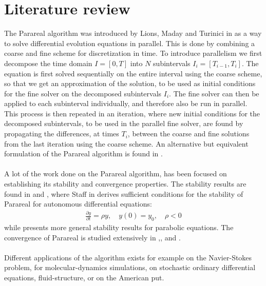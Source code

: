 \chapter{Literature review}
The Parareal algorithm was introduced by Lions, Maday and Turinici in \cite{lions2001resolution} as a way to solve differential evolution equations in parallel. This is done by combining a coarse and fine scheme for discretization in time. To introduce parallelism we first decompose the time domain $I=[0,T]$ into $N$ subintervals $I_i=[T_{i-1},T_i]$. The equation is first solved sequentially on the entire interval using the coarse scheme, so that we get an approximation of the solution, to be used as initial conditions for the fine solver on the decomposed subintervals $I_i$. The fine solver can then be applied to each subinterval individually, and therefore also be run in parallel. This process is then repeated in an iteration, where new initial conditions for the decomposed subintervals, to be used in the parallel fine solver, are found by propagating the differences, at times $T_i$, between the coarse and fine solutions from the last iteration using the coarse scheme. An alternative but equivalent formulation of the Parareal algorithm is found in \cite{baffico2002parallel}. 
\\
\\
A lot of the work done on the Parareal algorithm, has been focused on establishing its stability and convergence properties. The stability results are found in \cite{staff2005stability} and \cite{bal2005convergence}, where Staff in \cite{staff2005stability} derives sufficient conditions for the stability of Parareal for autonomous differential equations:
\begin{align*}
\frac{\partial y}{\partial t} =\rho y,\quad y(0)=y_0,\quad  \rho<0
\end{align*}
while \cite{bal2005convergence} presents more general stability results for parabolic equations. The convergence of Parareal is studied extensively in \cite{lions2001resolution},\cite{bal2005convergence},\cite{gander2007analysis} and \cite{gander2007superlinear}.
\\
\\
Different applications of the algorithm exists for example on the Navier-Stokes problem\cite{fischer2005parareal}, for molecular-dynamics simulations\cite{baffico2002parallel}, on stochastic ordinary differential equations\cite{bal2003parallelization}, fluid-structure\cite{farhat2003time}, or on the American put\cite{bal2002parareal}.
\\
